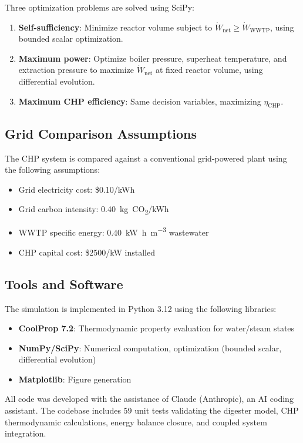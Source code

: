 \documentclass[12pt, letterpaper]{article}
\begin{document}
Three optimization problems are solved using SciPy:
\begin{enumerate}[noitemsep]
  \item \textbf{Self-sufficiency}: Minimize reactor volume subject to $\dot{W}_\text{net} \geq \dot{W}_\text{WWTP}$, using bounded scalar optimization.
  \item \textbf{Maximum power}: Optimize boiler pressure, superheat temperature, and extraction pressure to maximize $\dot{W}_\text{net}$ at fixed reactor volume, using differential evolution.
  \item \textbf{Maximum CHP efficiency}: Same decision variables, maximizing $\eta_\text{CHP}$.
\end{enumerate}

\subsection{Grid Comparison Assumptions}

The CHP system is compared against a conventional grid-powered plant using the following assumptions:
\begin{itemize}[noitemsep]
  \item Grid electricity cost: \$0.10/kWh
  \item Grid carbon intensity: \SI{0.40}{\kilo\gram}~CO\textsubscript{2}/kWh
  \item WWTP specific energy: \SI{0.40}{\kilo\watt\hour\per\cubic\metre} wastewater
  \item CHP capital cost: \$2500/kW installed
\end{itemize}

\subsection{Tools and Software}

The simulation is implemented in Python 3.12 using the following libraries:
\begin{itemize}[noitemsep]
  \item \textbf{CoolProp 7.2}: Thermodynamic property evaluation for water/steam states
  \item \textbf{NumPy/SciPy}: Numerical computation, optimization (bounded scalar, differential evolution)
  \item \textbf{Matplotlib}: Figure generation
\end{itemize}

All code was developed with the assistance of Claude (Anthropic), an AI coding assistant. The codebase includes 59 unit tests validating the digester model, CHP thermodynamic calculations, energy balance closure, and coupled system integration.
\end{document}
